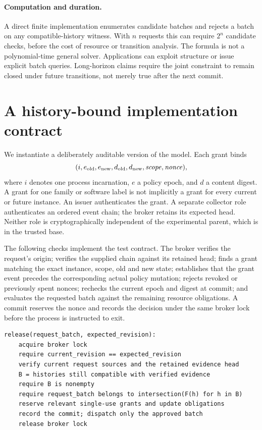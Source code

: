 \paragraph{Computation and duration.}
A direct finite implementation enumerates candidate batches and rejects a batch on any compatible-history witness. With $n$ requests this can require $2^n$ candidate checks, before the cost of resource or transition analysis. The formula is not a polynomial-time general solver. Applications can exploit structure or issue explicit batch queries. Long-horizon claims require the joint constraint to remain closed under future transitions, not merely true after the next commit.

\section{A history-bound implementation contract}
\label{sec:protocol}
We instantiate a deliberately auditable version of the model. Each grant binds
\begin{equation}
(i,e_{\rm old},e_{\rm new},d_{\rm old},d_{\rm new},\mathit{scope},\mathit{nonce}),
\end{equation}
where $i$ denotes one process incarnation, $e$ a policy epoch, and $d$ a content digest. A grant for one family or software label is not implicitly a grant for every current or future instance. An issuer authenticates the grant. A separate collector role authenticates an ordered event chain; the broker retains its expected head. Neither role is cryptographically independent of the experimental parent, which is in the trusted base.

The following checks implement the test contract. The broker verifies the request's origin; verifies the supplied chain against its retained head; finds a grant matching the exact instance, scope, old and new state; establishes that the grant event precedes the corresponding actual policy mutation; rejects revoked or previously spent nonces; rechecks the current epoch and digest at commit; and evaluates the requested batch against the remaining resource obligations. A commit reserves the nonce and records the decision under the same broker lock before the process is instructed to exit.

\begin{lstlisting}[caption={Reference logic for a finite history-sensitive batch query.}]
release(request_batch, expected_revision):
    acquire broker lock
    require current_revision == expected_revision
    verify current request sources and the retained evidence head
    B = histories still compatible with verified evidence
    require B is nonempty
    require request_batch belongs to intersection(F(h) for h in B)
    reserve relevant single-use grants and update obligations
    record the commit; dispatch only the approved batch
    release broker lock
\end{lstlisting}


